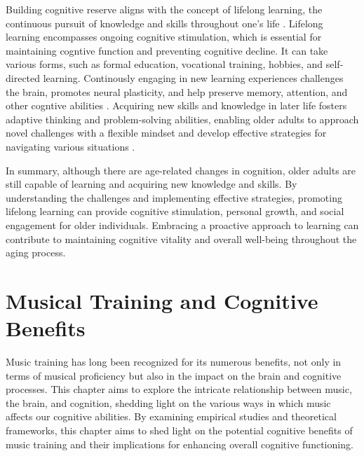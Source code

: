  Building cognitive reserve aligns with the concept of lifelong learning, the continuous pursuit of knowledge and skills throughout one's life \cite{Leipold2012}. Lifelong learning encompasses ongoing cognitive stimulation, which is essential for maintaining cogntive function and preventing cognitive decline. It can take various forms, such as formal education, vocational training, hobbies, and self-directed learning. Continously engaging in new learning experiences challenges the brain, promotes neural plasticity, and help preserve memory, attention, and other cogntive abilities \cite{Bangert2010}. Acquiring new skills and knowledge in later life fosters adaptive thinking and problem-solving abilities, enabling older adults to approach novel challenges with a flexible mindset and develop effective strategies for navigating various situations \cite{Greenwood2010}. 

In summary, although there are age-related changes in cognition, older adults are still capable of learning and acquiring new knowledge and skills. By understanding the challenges and implementing effective strategies, promoting lifelong learning can provide cognitive stimulation, personal growth, and social engagement for older individuals. Embracing a proactive approach to learning can contribute to maintaining cognitive vitality and overall well-being throughout the aging process.



\section{Musical Training and Cognitive Benefits}
Music training has long been recognized for its numerous benefits, not only in terms of musical proficiency but also in the impact on the brain and  cognitive processes. This chapter aims to explore the intricate relationship between music, the brain, and cognition, shedding light on the various ways in which music affects our cognitive abilities. By examining empirical studies and theoretical frameworks, this chapter aims to shed light on the potential cognitive benefits of music training and their implications for enhancing overall cognitive functioning.

